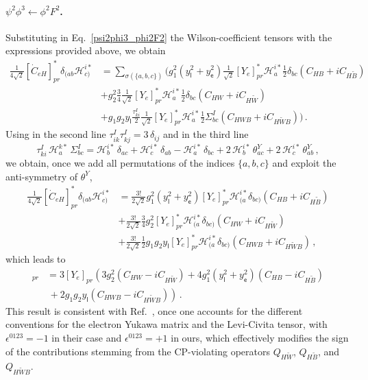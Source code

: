 \paragraph{$\psi^2\phi^3 \leftarrow \phi^2 F^2$.}
Substituting in Eq.~\eqref{psi2phi3_phi2F2} the Wilson-coefficient tensors with the expressions provided above, we obtain
\begin{align}
    \frac{1}{4\sqrt{2}}[\dot C_{eH}]^*_{pr} \delta_{(ab}\mathcal H_{c)}^{i*} &= \sum_{\sigma(\{a,b,c\})}\bigg( g_1^2 (y_{\mathsf l}^2+y_{\mathsf e}^2) \frac{1}{\sqrt{2}}[Y_e]_{pr}^* \mathcal H_a^{i*} \frac{1}{2}\delta_{bc}\left(C_{HB}+iC_{H\widetilde B}\right) \nonumber \\
    &+ g_2^2  \frac{3}{4} \frac{1}{\sqrt{2}}[Y_e]_{pr}^* \mathcal H_a^{i*} \frac{1}{2}\delta_{bc}\left(C_{HW}+iC_{H\widetilde W}\right) \nonumber \\ &+ g_1 g_2 y_{\mathsf l} \frac{\tau^I_{ki}}{2}\frac{1}{\sqrt{2}}[Y_e]_{pr}^* \mathcal H_a^{i*} \frac{1}{2}\Sigma^I_{bc}\left(C_{HWB}+iC_{H\widetilde WB}\right) \bigg) \,.
\end{align}
Using in the second line $\tau^I_{ik} \tau^I_{kj} = 3\, \delta_{ij}$ and in the third line
\begin{equation}
        \tau^I_{ki}\,\mathcal{H}^{k*}_a\,\Sigma^I_{bc}
    = \mathcal{H}^{i*}_b\,\delta_{ac}
    + \mathcal{H}^{i*}_c\,\delta_{ab}
    - \mathcal{H}^{i*}_a\,\delta_{bc}
    + 2\,\mathcal{H}^{i*}_b\,\theta^Y_{ac}
    + 2\,\mathcal{H}^{i*}_c\,\theta^Y_{ab}\,,
\end{equation}
we obtain, once we add all permutations of the indices $\{a,b,c\}$ and exploit the anti-symmetry of $\theta^Y$,
\begin{align}
    \frac{1}{4\sqrt{2}}[\dot C_{eH}]^*_{pr} \delta_{(ab}\mathcal H_{c)}^{i*} &= \frac{3!}{2\sqrt{2}}g_1^2 (y_{\mathsf l}^2+y_{\mathsf e}^2) [Y_e]^*_{pr}\mathcal H_{(a}^{i*} \delta_{bc)} \left(C_{HB}+iC_{H\widetilde B}\right) \nonumber \\
    & + \frac{3!}{2\sqrt{2}}\frac{3}{4}g_2^2 [Y_e]^*_{pr}\mathcal H_{(a}^{i*} \delta_{bc)} \left(C_{HW}+iC_{H\widetilde W}\right) \nonumber \\
    & + \frac{3!}{2\sqrt{2}}\frac{1}{2}g_1 g_2 y_{\mathsf l}[Y_e]^*_{pr} \mathcal H_{(a}^{i*} \delta_{bc)} \left(C_{HWB}+iC_{H\widetilde WB}\right)\,,
\end{align}
which leads to
\begin{align}
    [\dot C_{eH}]_{pr} &= 3[Y_e]_{pr}\left(
    3g_2^2 \left(C_{HW}-iC_{H\widetilde W}\right) + 4 g_1^2 (y_{\mathsf l}^2+y_{\mathsf e}^2) \left(C_{HB}-iC_{H\widetilde B}\right)\right. \nonumber \\& \left.\,+ 2 g_1 g_2 y_{\mathsf l} \left(C_{HWB}-iC_{H\widetilde WB}\right)
    \right)\,.
\end{align}
This result is consistent with Ref.~\cite{Alonso:2013hga}, once one accounts for the different conventions for the electron Yukawa matrix and the Levi-Civita tensor, with $\epsilon^{0123} = -1$ in their case and $\epsilon^{0123} = +1$ in ours, which effectively modifies the sign of the contributions stemming from the CP-violating operators $Q_{H\widetilde W}$, $Q_{H\widetilde B}$, and $Q_{H\widetilde W B}$.

